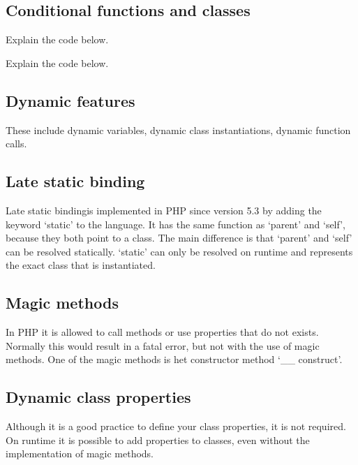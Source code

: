 \documentclass[../main.tex]{subfiles}
\begin{document}
    \subsection{Conditional functions and classes}
    Explain the code below.
    

    Explain the code below.
    

    
    \subsection{Dynamic features}
    These include dynamic variables, dynamic class instantiations, dynamic function calls.
    

    \subsection{Late static binding}
    Late static binding\footnotemark is implemented in PHP since version 5.3 by adding the keyword `static' to the language.
    It has the same function as `parent' and `self', because they both point to a class. 
    The main difference is that `parent' and `self' can be resolved statically.
    `static' can only be resolved on runtime and represents the exact class that is instantiated.
    
    \subsection{Magic methods}
    In PHP it is allowed to call methods or use properties that do not exists.
    Normally this would result in a fatal error, but not with the use of magic methods.
    One of the magic methods is het constructor method `\_\_ construct'.

    \subsection{Dynamic class properties}
    Although it is a good practice to define your class properties, it is not required.
    On runtime it is possible to add properties to classes, even without the implementation of magic methods.
    
    
\end{document}

